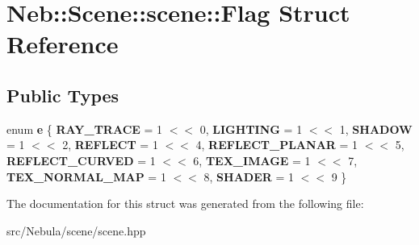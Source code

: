 \hypertarget{structNeb_1_1Scene_1_1scene_1_1Flag}{\section{\-Neb\-:\-:\-Scene\-:\-:scene\-:\-:\-Flag \-Struct \-Reference}
\label{structNeb_1_1Scene_1_1scene_1_1Flag}
}
\subsection*{\-Public \-Types}
\begin{DoxyCompactItemize}
\item 
enum {\bfseries e} \{ \*
{\bfseries \-R\-A\-Y\-\_\-\-T\-R\-A\-C\-E} =  1 $<$$<$ 0, 
{\bfseries \-L\-I\-G\-H\-T\-I\-N\-G} =  1 $<$$<$ 1, 
{\bfseries \-S\-H\-A\-D\-O\-W} =  1 $<$$<$ 2, 
{\bfseries \-R\-E\-F\-L\-E\-C\-T} =  1 $<$$<$ 4, 
\*
{\bfseries \-R\-E\-F\-L\-E\-C\-T\-\_\-\-P\-L\-A\-N\-A\-R} =  1 $<$$<$ 5, 
{\bfseries \-R\-E\-F\-L\-E\-C\-T\-\_\-\-C\-U\-R\-V\-E\-D} =  1 $<$$<$ 6, 
{\bfseries \-T\-E\-X\-\_\-\-I\-M\-A\-G\-E} =  1 $<$$<$ 7, 
{\bfseries \-T\-E\-X\-\_\-\-N\-O\-R\-M\-A\-L\-\_\-\-M\-A\-P} =  1 $<$$<$ 8, 
\*
{\bfseries \-S\-H\-A\-D\-E\-R} =  1 $<$$<$ 9
 \}
\end{DoxyCompactItemize}


\-The documentation for this struct was generated from the following file\-:\begin{DoxyCompactItemize}
\item 
src/\-Nebula/scene/scene.\-hpp\end{DoxyCompactItemize}
